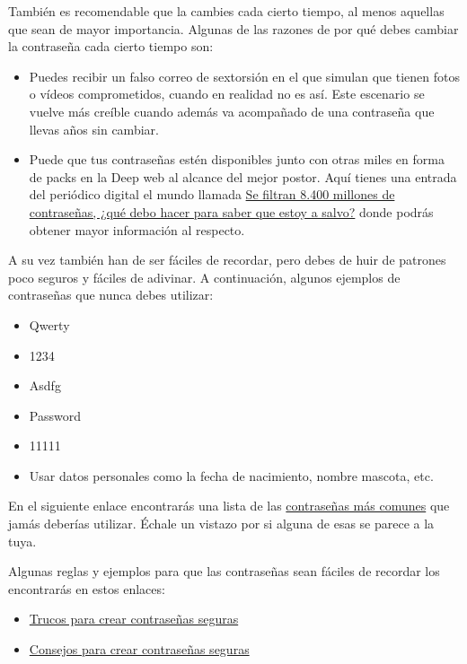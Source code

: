 \documentclass[
  spanish,
  a4paper,
  openany]{book}
\begin{document}
También es recomendable que la cambies cada cierto tiempo, al menos aquellas que sean de mayor importancia. Algunas de las razones de por qué debes cambiar la contraseña cada cierto tiempo son:

\begin{itemize}
\item
  Puedes recibir un falso correo de sextorsión en el que simulan que tienen fotos o vídeos comprometidos, cuando en realidad no es así. Este escenario se vuelve más creíble cuando además va acompañado de una contraseña que llevas años sin cambiar.
\item
  Puede que tus contraseñas estén disponibles junto con otras miles en forma de packs en la Deep web al alcance del mejor postor. Aquí tienes una entrada del periódico digital el mundo llamada \href{https://www.elmundo.es/tecnologia/2021/06/08/60bf3b2a21efa0ae7f8b462e.html}{Se filtran 8.400 millones de contraseñas, ¿qué debo hacer para saber que estoy a salvo?} donde podrás obtener mayor información al respecto.
\end{itemize}

A su vez también han de ser fáciles de recordar, pero debes de huir de patrones poco seguros y fáciles de adivinar. A continuación, algunos ejemplos de contraseñas que nunca debes utilizar:

\begin{itemize}
\item
  Qwerty
\item
  1234
\item
  Asdfg
\item
  Password
\item
  11111
\item
  Usar datos personales como la fecha de nacimiento, nombre mascota, etc.
\end{itemize}

En el siguiente enlace encontrarás una lista de las \href{https://nordpass.com/most-common-passwords-list/}{contraseñas más comunes} que jamás deberías utilizar. Échale un vistazo por si alguna de esas se parece a la tuya.

Algunas reglas y ejemplos para que las contraseñas sean fáciles de recordar los encontrarás en estos enlaces:

\begin{itemize}
\item
  \href{https://www.pandasecurity.com/es/mediacenter/seguridad/10-trucos-para-crear-contrasenas-seguras/}{Trucos para crear contraseñas seguras}
\item
  \href{https://www.genbeta.com/seguridad/especial-contrasenas-seguras-consejos-para-mejorar-la-seguridad-de-tus-contrasenas}{Consejos para crear contraseñas seguras}
\end{itemize}
\end{document}
